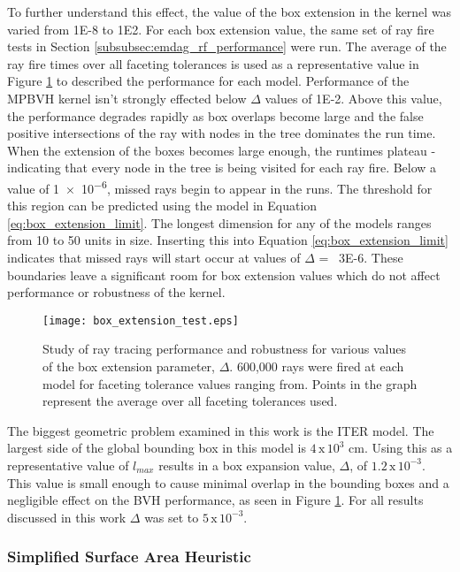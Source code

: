 To further understand this effect, the value of the box extension in the kernel
was varied from \num{1E-8} to \num{1E2}. For each box extension value, the same
set of ray fire tests in Section \ref{subsubsec:emdag_rf_performance} were
run. The average of the ray fire times over all faceting tolerances is used as a
representative value in Figure \ref{fig:box_bump_tests} to described the
performance for each model. Performance of the MPBVH kernel isn't strongly
effected below $\Delta$ values of \num{1E-2}. Above this value, the performance
degrades rapidly as box overlaps become large and the false positive
intersections of the ray with nodes in the tree dominates the run time. When the
extension of the boxes becomes large enough, the runtimes plateau - indicating
that every node in the tree is being visited for each ray fire. Below a value of
\num{1e-6}, missed rays begin to appear in the runs. The threshold for this
region can be predicted using the model in Equation
\ref{eq:box_extension_limit}. The longest dimension for any of the models ranges
from 10 to 50 units in size. Inserting this into Equation
\ref{eq:box_extension_limit} indicates that missed rays will start occur at
values of $\Delta$ = ~\num{3E-6}. These boundaries leave a significant room for
box extension values which do not affect performance or robustness of the
kernel.

\begin{figure}[H]
  \centering
  \texttt{[image: box\_extension\_test.eps]}
  \caption{Study of ray tracing performance and robustness for various values of
    the box extension parameter, $\Delta$. 600,000 rays were fired at each model
    for faceting tolerance values ranging from. Points in the graph represent
    the average over all faceting tolerances used.}
  \label{fig:box_bump_tests}
\end{figure}

The biggest geometric problem examined in this work is the ITER model. The
largest side of the global bounding box in this model is $4 \, \text{x} \,
10^{3}$ cm. Using this as a representative value of $l_{max}$ results in a box
expansion value, $\Delta$, of $1.2 \, \text{x} \, 10^{-3}$. This value is small
enough to cause minimal overlap in the bounding boxes and a negligible effect on
the BVH performance, as seen in Figure \ref{fig:box_bump_tests}. For all results
discussed in this work $\Delta$ was set to $5 \, \text{x} \, 10 ^{-3}$.

\subsubsection{Simplified Surface Area Heuristic}

